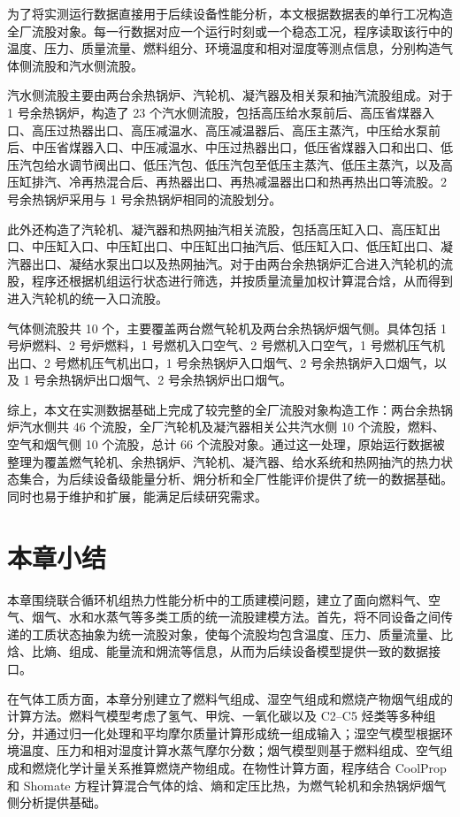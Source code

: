为了将实测运行数据直接用于后续设备性能分析，本文根据数据表的单行工况构造全厂流股对象。每一行数据对应一个运行时刻或一个稳态工况，程序读取该行中的温度、压力、质量流量、燃料组分、环境温度和相对湿度等测点信息，分别构造气体侧流股和汽水侧流股。

汽水侧流股主要由两台余热锅炉、汽轮机、凝汽器及相关泵和抽汽流股组成。对于 1 号余热锅炉，构造了 23 个汽水侧流股，包括高压给水泵前后、高压省煤器入口、高压过热器出口、高压减温水、高压减温器后、高压主蒸汽，中压给水泵前后、中压省煤器入口、中压减温水、中压过热器出口，低压省煤器入口和出口、低压汽包给水调节阀出口、低压汽包、低压汽包至低压主蒸汽、低压主蒸汽，以及高压缸排汽、冷再热混合后、再热器出口、再热减温器出口和热再热出口等流股。2 号余热锅炉采用与 1 号余热锅炉相同的流股划分。

此外还构造了汽轮机、凝汽器和热网抽汽相关流股，包括高压缸入口、高压缸出口、中压缸入口、中压缸出口、中压缸出口抽汽后、低压缸入口、低压缸出口、凝汽器出口、凝结水泵出口以及热网抽汽。对于由两台余热锅炉汇合进入汽轮机的流股，程序还根据机组运行状态进行筛选，并按质量流量加权计算混合焓，从而得到进入汽轮机的统一入口流股。

气体侧流股共 10 个，主要覆盖两台燃气轮机及两台余热锅炉烟气侧。具体包括 1 号炉燃料、2 号炉燃料，1 号燃机入口空气、2 号燃机入口空气，1 号燃机压气机出口、2 号燃机压气机出口，1 号余热锅炉入口烟气、2 号余热锅炉入口烟气，以及 1 号余热锅炉出口烟气、2 号余热锅炉出口烟气。

综上，本文在实测数据基础上完成了较完整的全厂流股对象构造工作：两台余热锅炉汽水侧共 46 个流股，全厂汽轮机及凝汽器相关公共汽水侧 10 个流股，燃料、空气和烟气侧 10 个流股，总计 66 个流股对象。通过这一处理，原始运行数据被整理为覆盖燃气轮机、余热锅炉、汽轮机、凝汽器、给水系统和热网抽汽的热力状态集合，为后续设备级能量分析、㶲分析和全厂性能评价提供了统一的数据基础。同时也易于维护和扩展，能满足后续研究需求。

\section{本章小结}

本章围绕联合循环机组热力性能分析中的工质建模问题，建立了面向燃料气、空气、烟气、水和水蒸气等多类工质的统一流股建模方法。首先，将不同设备之间传递的工质状态抽象为统一流股对象，使每个流股均包含温度、压力、质量流量、比焓、比熵、组成、能量流和㶲流等信息，从而为后续设备模型提供一致的数据接口。

在气体工质方面，本章分别建立了燃料气组成、湿空气组成和燃烧产物烟气组成的计算方法。燃料气模型考虑了氢气、甲烷、一氧化碳以及 C2--C5 烃类等多种组分，并通过归一化处理和平均摩尔质量计算形成统一组成输入；湿空气模型根据环境温度、压力和相对湿度计算水蒸气摩尔分数；烟气模型则基于燃料组成、空气组成和燃烧化学计量关系推算燃烧产物组成。在物性计算方面，程序结合 CoolProp 和 Shomate 方程计算混合气体的焓、熵和定压比热，为燃气轮机和余热锅炉烟气侧分析提供基础。

